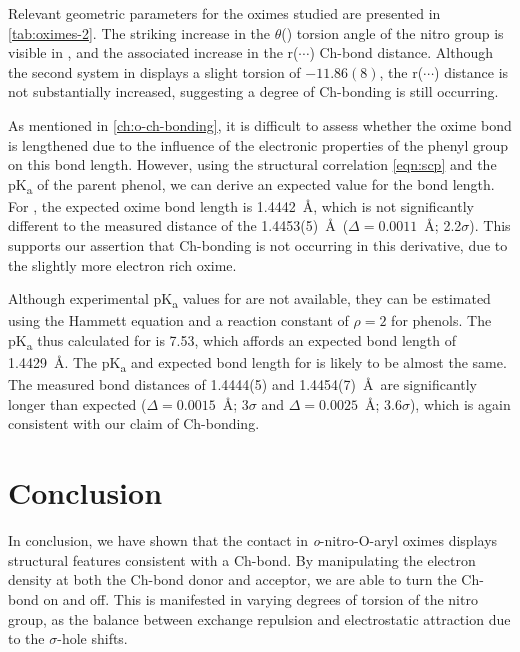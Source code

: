 \begin{refsection}
Relevant geometric parameters for the oximes studied are presented in \cref{tab:oximes-2}.
The striking increase in the $\theta$() torsion angle of the nitro group is visible in , and the associated increase in the r($\cdots$) Ch-bond distance.
Although the second system in  displays a slight torsion of $-11.86(8)$\degree{}, the r($\cdots$) distance is not substantially increased, suggesting a degree of Ch-bonding is still occurring.

As mentioned in \cref{ch:o-ch-bonding}, it is difficult to assess whether the oxime  bond is lengthened due to the influence of the electronic properties of the phenyl group on this bond length.
However, using the structural correlation \cref{eqn:scp} and the pK\textsubscript{a} of the parent phenol, we can derive an expected value for the bond length.\autocite{Yeoh2012,Socrates1970}
For , the expected oxime bond length is 1.4442~\AA, which is not significantly different to the measured distance of the 1.4453(5)~\AA\ ($\Delta = 0.0011$~\AA{}; 2.2$\sigma$).
This supports our assertion that Ch-bonding is not occurring in this derivative, due to the slightly more electron rich oxime.

Although experimental pK\textsubscript{a} values for  are not available, they can be estimated using the Hammett equation and a reaction constant of $\rho=2$ for phenols.\autocite{Hansch1991}
The pK\textsubscript{a} thus calculated for  is 7.53, which affords an expected bond length of 1.4429~\AA.\@
The pK\textsubscript{a} and expected bond length for  is likely to be almost the same.
The measured bond distances of 1.4444(5) and 1.4454(7)~\AA\ are significantly longer than expected ($\Delta = 0.0015$~\AA{}; 3$\sigma$ and $\Delta = 0.0025$~\AA{}; 3.6$\sigma$), which is again consistent with our claim of Ch-bonding.

\section{Conclusion}

In conclusion, we have shown that the  contact in \textit{o}-nitro-O-aryl oximes displays structural features consistent with a Ch-bond.
By manipulating the electron density at both the Ch-bond donor and acceptor, we are able to turn the Ch-bond on and off.
This is manifested in varying degrees of torsion of the nitro group, as the balance between exchange repulsion and electrostatic attraction due to the $\sigma$-hole shifts.


\end{refsection}
